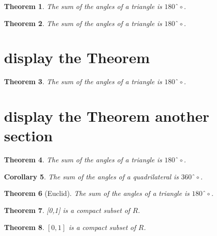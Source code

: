 \documentclass{article}
\begin{document}
\newtheorem{thm}{Theorem}[section]
\newtheorem{cor}[thm]{Corollary}
\begin{thm}
The sum of the angles of a triangle is $180ˆ\circ$.
\end{thm}

\begin{thm}
The sum of the angles of a triangle is $180ˆ\circ$.
\end{thm}

\section{display the Theorem}

\begin{thm}
The sum of the angles of a triangle is $180ˆ\circ$.
\end{thm}

\section{display the Theorem another section}

\begin{thm}
The sum of the angles of a triangle is $180ˆ\circ$.
\end{thm}
\begin{cor}
The sum of the angles of a quadrilateral is $360ˆ\circ$.
\end{cor}


\begin{thm}[Euclid]
The sum of the angles of a triangle is $180ˆ\circ$.
\end{thm}

\begin{thm}
[0,1] is a compact subset of ${R}$.
\end{thm}

\begin{thm}
$[0,1]$ is a compact subset of ${R}$.
\end{thm}
\end{document}
